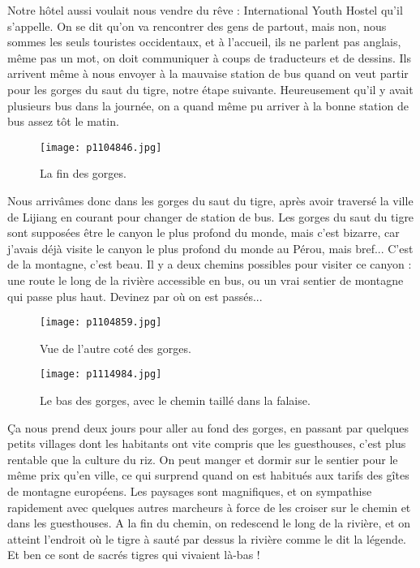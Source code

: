 \documentclass{book}
\begin{document}
Notre hôtel aussi voulait nous vendre du rêve : International Youth Hostel qu'il s'appelle. On se dit qu'on va rencontrer des gens de partout, mais non, nous sommes les seuls touristes occidentaux, et à l'accueil, ils ne parlent pas anglais, même pas un mot, on doit communiquer à coups de traducteurs et de dessins. Ils arrivent même à nous envoyer à la mauvaise station de bus quand on veut partir pour les gorges du saut du tigre, notre étape suivante. Heureusement qu'il y avait plusieurs bus dans la journée, on a quand même pu arriver à la bonne station de bus assez tôt le matin.


\begin{figure}[h]
\centering
\texttt{[image: p1104846.jpg]}
\caption*{La fin des gorges.}
\end{figure}



Nous arrivâmes donc dans les gorges du saut du tigre, après avoir traversé la ville de Lijiang en courant pour changer de station de bus. Les gorges du saut du tigre sont supposées être le canyon le plus profond du monde, mais c'est bizarre, car j'avais déjà visite le canyon le plus profond du monde au Pérou, mais bref... C'est de la montagne, c'est beau. Il y a deux chemins possibles pour visiter ce canyon : une route le long de la rivière accessible en bus, ou un vrai sentier de montagne qui passe plus haut. Devinez par où on est passés...


\begin{figure}[h]
\centering
\texttt{[image: p1104859.jpg]}
\caption*{Vue de l'autre coté des gorges.}
\end{figure}



\begin{wrapfigure}{l}{0.55\textwidth}
\centering
\texttt{[image: p1114984.jpg]}
\caption*{Le bas des gorges, avec le chemin taillé dans la falaise.}
\end{wrapfigure}

Ça nous prend deux jours pour aller au fond des gorges, en passant par quelques petits villages dont les habitants ont vite compris que les guesthouses, c'est plus rentable que la culture du riz. On peut manger et dormir sur le sentier pour le même prix qu'en ville, ce qui surprend quand on est habitués aux tarifs des gîtes de montagne européens. Les paysages sont magnifiques, et on sympathise rapidement avec quelques autres marcheurs à force de les croiser sur le chemin et dans les guesthouses.
A la fin du chemin, on redescend le long de la rivière, et on atteint l'endroit où le tigre à sauté par dessus la rivière comme le dit la légende. Et ben ce sont de sacrés tigres qui vivaient là-bas !
\end{document}
